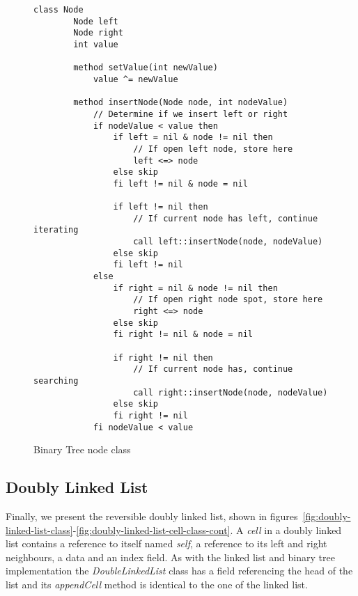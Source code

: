 \begin{figure}[ht!]
    \centering
    \begin{lstlisting}[style = basic, language = roopl] 
    class Node
        Node left
        Node right
        int value
    
        method setValue(int newValue)
            value ^= newValue 
    
        method insertNode(Node node, int nodeValue)
            // Determine if we insert left or right
            if nodeValue < value then
                if left = nil & node != nil then
                    // If open left node, store here
                    left <=> node
                else skip
                fi left != nil & node = nil
    
                if left != nil then
                    // If current node has left, continue iterating
                    call left::insertNode(node, nodeValue)
                else skip
                fi left != nil
            else
                if right = nil & node != nil then
                    // If open right node spot, store here
                    right <=> node
                else skip
                fi right != nil & node = nil
    
                if right != nil then
                    // If current node has, continue searching
                    call right::insertNode(node, nodeValue)
                else skip
                fi right != nil
            fi nodeValue < value
    \end{lstlisting}
    \caption{Binary Tree node class}
    \label{fig:binary-tree-node-class}
\end{figure}


\subsection{Doubly Linked List}
\label{subsec:doubly-linked-list}
Finally, we present the reversible doubly linked list, shown in figures~\ref{fig:doubly-linked-list-class}-\ref{fig:doubly-linked-list-cell-class-cont}. A \textit{cell} in a doubly linked list contains a reference to itself named \textit{self}, a reference to its left and right neighbours, a data and an index field. As with the linked list and binary tree implementation the \textit{DoubleLinkedList} class has a field referencing the head of the list and its \textit{appendCell} method is identical to the one of the linked list. 

